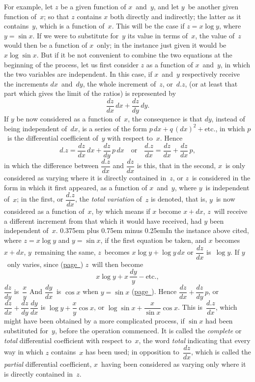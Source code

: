 \documentclass[12pt]{book}[2005/09/16]
\newcommand{\Loosen}{\spaceskip 0.375em plus 0.75em minus 0.25em}
\newcommand{\Pagelabel}[1]{\phantomsection\label{page:#1}}
\newcommand{\PageSep}[1]{\Pagelabel{#1}\ignorespaces}
\newcommand{\PageRef}[2][page]{\hyperref[page:#2]{#1~\pageref*{page:#2}}}
\renewcommand{\etc}{\text{etc}}
\renewcommand{\(}{{\upshape(}}
\renewcommand{\)}{{\upshape)}}
\begin{document}
For example, let $z$ be a given function of $x$~and~$y$,
and let $y$~be another given function of~$x$; so that $z$
contains $x$ both directly and indirectly; the latter as
it contains~$y$, which is a function of~$x$. This will be
the case if $z = x\log y$, where $y = \sin x$. If we were to
substitute for~$y$ its value in terms of~$x$, the value of~$z$
would then be a function of $x$~only; in the instance
just given it would be $x\log\sin x$. But if it be not convenient
to combine the two equations at the beginning
of the process, let us first consider $z$ as a function of
$x$~and~$y$, in which the two variables are independent.
In this case, if $x$~and~$y$ respectively receive the increments
$dx$~and~$dy$, the whole increment of~$z$, or~$d.z$, (or
at least that part which gives the limit of the ratios)
is represented by
\[
\frac{dz}{dx}\, dx + \frac{dz}{dy}\, dy.
\]
If $y$ be now considered as a function of~$x$, the consequence
is that $dy$, instead of being independent of~$dx$,
is a series of the form $p\, dx + q\, (dx)^{2} + \etc.$, in which $p$~is
the differential coefficient of~$y$ with respect to~$x$.
Hence
\[
d.z = \frac{dz}{dx}\, dx + \frac{dz}{dy}\, p\, dx \quad\text{or}\quad
\frac{d.z}{dx} = \frac{dz}{dx} + \frac{dz}{dx}\, p,
\]
in which the difference between $\dfrac{d.z}{dx}$ and $\dfrac{dz}{dx}$ is this,
that in the second, $x$~is only considered as varying
where it is directly contained in~$z$, or $z$~is considered
in the form in which it first appeared, as a function of
$x$~and~$y$, where $y$~is independent of~$x$; in the first, or
$\dfrac{d.z}{dx}$, the \emph{total variation} of~$z$ is denoted, that is, $y$~is
%
%
now considered as a function of~$x$, by which means if
$x$ become $x + dx$, $z$~will receive a different increment
\PageSep{96}
from that which it would have received, had $y$ been
independent of~$x$. {\Loosen In the instance above cited, where
$z = x\log y$ and $y = \sin x$, if the first equation be taken,
and $x$ becomes $x + dx$, $y$~remaining the same, $z$~becomes
$x\log y + \log y\, dx$ or $\dfrac{dz}{dx}$ is~$\log y$.} If $y$~only varies,
since (\PageRef{20}) $z$~will then become
\[
x\log y + x\, \frac{dy}{y} - \etc.,
\]
$\dfrac{dz}{dy}$ is~$\dfrac{x}{y}$ And $\dfrac{dy}{dx}$~is $\cos x$ when $y = \sin x$ (\PageRef{20}).
Hence $\dfrac{dz}{dx} + \dfrac{dz}{dy}\, p$, or $\dfrac{dz}{dx} + \dfrac{dz}{dy}\, \dfrac{dy}{dx}$ is $\log y + \dfrac{x}{y} \cos x$,
or $\log\sin x + \dfrac{x}{\sin x} \cos x$. This is~$\dfrac{d.z}{dx}$, which might
have been obtained by a more complicated process, if
$\sin x$ had been substituted for~$y$, before the operation
commenced. It is called the \emph{complete} or \emph{total} differential
%
%
coefficient with respect to~$x$, the word \emph{total} indicating
that every way in which $z$ contains~$x$ has been
used; in opposition to~$\dfrac{dz}{dx}$, which is called the \emph{partial}
%
differential coefficient, $x$~having been considered as
varying only where it is directly contained in~$z$.
\end{document}
